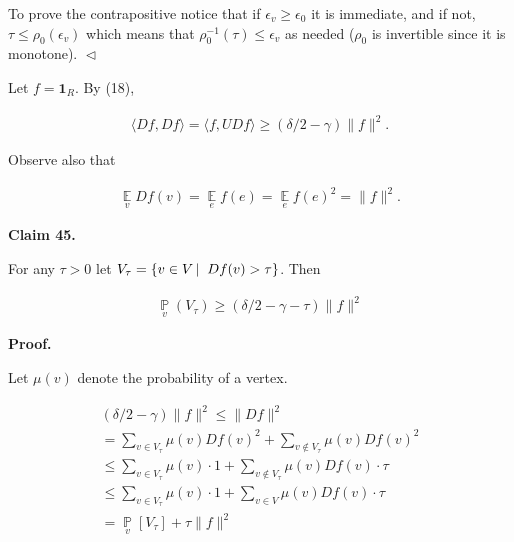 To prove the contrapositive notice that if $\epsilon_{v}\geq\epsilon_{0}$ it is immediate, and if not, $\tau\leq\rho_{0}(\epsilon_{v})$ which means that $\rho_{0}^{-1}(\tau)\leq\epsilon_{v}$ as needed ($\rho_{0}$ is invertible since it is monotone).
$\vartriangleleft$\par




Let $f={\mathbf{1}}_{R}$. By (18),\par


\[\begin{gathered}
\langle Df,Df\rangle=\langle f,UDf\rangle\geq(\delta/2-\gamma)\lVert f\rVert^{2}.
\end{gathered}\]


Observe also that\par


\[\begin{gathered}
\operatorname*{\mathbb{E}}_{v}Df(v)=\operatorname*{\mathbb{E}}_{e}f(e)=\operatorname*{\mathbb{E}}_{e}f(e)^{2}=\lVert f\rVert^{2}.
\end{gathered}\]





\par\medskip\noindent\textbf{
Claim 45. 
}\par



For any $\tau>0$ let $V_{\tau}=\left\{v\in V\left|\;\vphantom{v\in VDf(v)>\tau}\right.Df(v)>\tau\right\}$. Then\par


\[\begin{gathered}
\operatorname*{\mathbb{P}}_{v}(V_{\tau})\geq(\delta/2-\gamma-\tau)\lVert f\rVert^{2}
\end{gathered}\]







\par\medskip\noindent\textbf{
\textbf{Proof}.}\par




Let $\mu(v)$ denote the probability of a vertex.\par


\[\begin{gathered}
\displaystyle(\delta/2-\gamma)\lVert f\rVert^{2} \displaystyle\leq\lVert Df\rVert^{2} \\
\displaystyle=\sum_{v\in V_{\tau}}\mu(v)Df(v)^{2}+\sum_{v\not\in V_{\tau}}\mu(v)Df(v)^{2} \\
\displaystyle\leq\sum_{v\in V_{\tau}}\mu(v)\cdot 1+\sum_{v\not\in V_{\tau}}\mu(v)Df(v)\cdot\tau \\
\displaystyle\leq\sum_{v\in V_{\tau}}\mu(v)\cdot 1+\sum_{v\in V}\mu(v)Df(v)\cdot\tau \\
\displaystyle=\operatorname*{\mathbb{P}}_{v}[V_{\tau}]+\tau\lVert f\rVert^{2}
\end{gathered}\]


